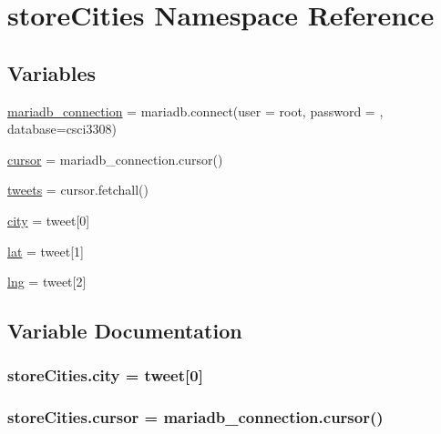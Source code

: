 \hypertarget{namespacestoreCities}{}\section{store\+Cities Namespace Reference}
\label{namespacestoreCities}
\subsection*{Variables}
\begin{DoxyCompactItemize}
\item 
\hyperlink{namespacestoreCities_a8f8c246ff77d060c8069df768b152c49}{mariadb\+\_\+connection} = mariadb.\+connect(user = \textquotesingle{}root\textquotesingle{}, password = \textquotesingle{}\textquotesingle{}, database=\textquotesingle{}csci3308\textquotesingle{})
\item 
\hyperlink{namespacestoreCities_a646bdebfa2acb2fc972c5ad8432a1b77}{cursor} = mariadb\+\_\+connection.\+cursor()
\item 
\hyperlink{namespacestoreCities_a7b9da38e052d859e8c0dcc3ab0c8948c}{tweets} = cursor.\+fetchall()
\item 
\hyperlink{namespacestoreCities_a49f77864c3f28f848d31dfc26ab2a9a4}{city} = tweet\mbox{[}0\mbox{]}
\item 
\hyperlink{namespacestoreCities_abb67378575f786533b2e9e00137c0c11}{lat} = tweet\mbox{[}1\mbox{]}
\item 
\hyperlink{namespacestoreCities_a991d2b6bd50ff73a116167b0ec2fb252}{lng} = tweet\mbox{[}2\mbox{]}
\end{DoxyCompactItemize}


\subsection{Variable Documentation}
\subsubsection[{\texorpdfstring{city}{city}}]{\setlength{\rightskip}{0pt plus 5cm}store\+Cities.\+city = tweet\mbox{[}0\mbox{]}}\hypertarget{namespacestoreCities_a49f77864c3f28f848d31dfc26ab2a9a4}{}\label{namespacestoreCities_a49f77864c3f28f848d31dfc26ab2a9a4}
\subsubsection[{\texorpdfstring{cursor}{cursor}}]{\setlength{\rightskip}{0pt plus 5cm}store\+Cities.\+cursor = mariadb\+\_\+connection.\+cursor()}\hypertarget{namespacestoreCities_a646bdebfa2acb2fc972c5ad8432a1b77}{}\label{namespacestoreCities_a646bdebfa2acb2fc972c5ad8432a1b77}
